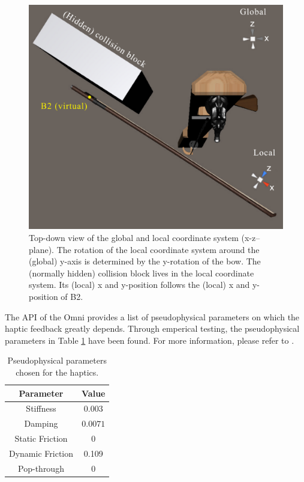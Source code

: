 \documentclass[dvipsnames, pdftex]{article}
\begin{document}
\begin{figure}[t]\includegraphics[width=1.0\columnwidth]{SMC 2020 paper template LaTeX/figures/globalLocal.pdf}
\centering
  \caption{Top-down view of the global and local coordinate system (x-z--plane). The rotation of the local coordinate system around the (global) y-axis is determined by the y-rotation of the bow. The (normally hidden) collision block lives in the local coordinate system. Its (local) x and y-position follows the (local) x and y-position of B2. \label{fig:localGlobal}}
\end{figure}

The API of the Omni provides a list of pseudophysical parameters on which the haptic feedback greatly depends. Through emperical testing, the pseudophysical parameters in Table \ref{tab:pseudoParams} have been found. For more information, please refer to \cite{OmniAPI2018}. 
\begin{table}[h]
    \centering
    \begin{tabular}{|c|c|}
    \hline
        Parameter & Value \\\hline
        Stiffness & $0.003$ \\
        Damping & $0.0071$ \\
        Static Friction & 0 \\
        Dynamic Friction & 0.109 \\ 
        Pop-through & 0\\\hline
    \end{tabular}
    \caption{Pseudophysical parameters chosen for the haptics.}
    \label{tab:pseudoParams}
\end{table}
\end{document}
